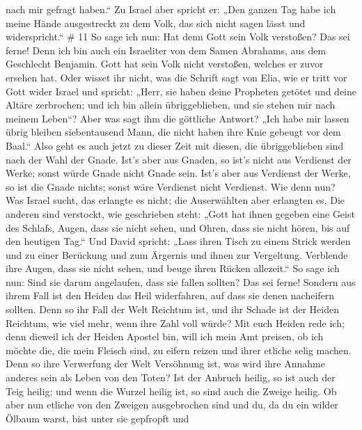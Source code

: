 nach mir gefragt haben.``  Zu Israel aber spricht er: „Den
ganzen Tag habe ich meine Hände ausgestreckt zu dem Volk, das sich nicht
sagen lässt und widerspricht.`` \# 11  So sage ich nun: Hat
denn Gott sein Volk verstoßen? Das sei ferne! Denn ich bin auch ein
Israeliter von dem Samen Abrahams, aus dem Geschlecht Benjamin.
 Gott hat sein Volk nicht verstoßen, welches er zuvor
ersehen hat. Oder wisset ihr nicht, was die Schrift sagt von Elia, wie
er tritt vor Gott wider Israel und spricht:  „Herr, sie
haben deine Propheten getötet und deine Altäre zerbrochen; und ich bin
allein übriggeblieben, und sie stehen mir nach meinem Leben``?
 Aber was sagt ihm die göttliche Antwort? „Ich habe mir
lassen übrig bleiben siebentausend Mann, die nicht haben ihre Knie
gebeugt vor dem Baal.``  Also geht es auch jetzt zu dieser
Zeit mit diesen, die übriggeblieben sind nach der Wahl der Gnade.
 Ist's aber aus Gnaden, so ist's nicht aus Verdienst der
Werke; sonst würde Gnade nicht Gnade sein. Ist's aber aus Verdienst der
Werke, so ist die Gnade nichts; sonst wäre Verdienst nicht Verdienst.
 Wie denn nun? Was Israel sucht, das erlangte es nicht; die
Auserwählten aber erlangten es. Die anderen sind verstockt, 
wie geschrieben steht: „Gott hat ihnen gegeben eine Geist des Schlafs,
Augen, dass sie nicht sehen, und Ohren, dass sie nicht hören, bis auf
den heutigen Tag.``  Und David spricht: „Lass ihren Tisch zu
einem Strick werden und zu einer Berückung und zum Ärgernis und ihnen
zur Vergeltung.  Verblende ihre Augen, dass sie nicht
sehen, und beuge ihren Rücken allezeit.``  So sage ich nun:
Sind sie darum angelaufen, dass sie fallen sollten? Das sei ferne!
Sondern aus ihrem Fall ist den Heiden das Heil widerfahren, auf dass sie
denen nacheifern sollten.  Denn so ihr Fall der Welt
Reichtum ist, und ihr Schade ist der Heiden Reichtum, wie viel mehr,
wenn ihre Zahl voll würde?  Mit euch Heiden rede ich; denn
dieweil ich der Heiden Apostel bin, will ich mein Amt preisen,
 ob ich möchte die, die mein Fleisch sind, zu eifern reizen
und ihrer etliche selig machen.  Denn so ihre Verwerfung
der Welt Versöhnung ist, was wird ihre Annahme anderes sein als Leben
von den Toten?  Ist der Anbruch heilig, so ist auch der
Teig heilig; und wenn die Wurzel heilig ist, so sind auch die Zweige
heilig.  Ob aber nun etliche von den Zweigen ausgebrochen
sind und du, da du ein wilder Ölbaum warst, bist unter sie gepfropft und
